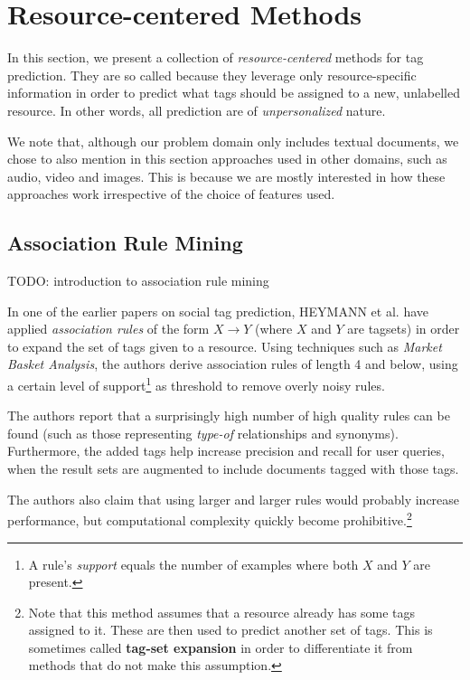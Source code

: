\section{Resource-centered Methods}\label{section:resource_centered_methods}

In this section, we present a collection of  \textit{resource-centered} methods for tag prediction. They are so called because they leverage only resource-specific information in order to predict what tags should be assigned to a new, unlabelled resource. In other words, all prediction are of \textit{unpersonalized} nature.

We note that, although our problem domain only includes textual documents, we chose to also mention in this section approaches used in other domains, such as audio, video and images. This is because we are mostly interested in how these approaches work irrespective of the choice of features used.

\subsection{Association Rule Mining}

{\color{red} TODO: introduction to association rule mining}

In one of the earlier papers on social tag prediction, HEYMANN et al. \citeyearpar{heymann_etal_2008} have applied \textit{association rules} of the form $X \rightarrow Y$ (where $X$ and $Y$ are tagsets) in order to expand the set of tags given to a resource. Using techniques such as \textit{Market Basket Analysis}, the authors derive association rules of length 4 and below, using a certain level of support\footnote{A rule's \textit{support} equals the number of examples where both $X$ and $Y$ are present.} as threshold to remove overly noisy rules.

The authors report \citep{heymann_etal_2008} that a surprisingly high number of high quality rules can be found (such as those representing \textit{type-of} relationships and synonyms). Furthermore, the added tags help increase precision and recall for user queries, when the result sets are augmented to include documents tagged with those tags.

The authors also claim that using larger and larger rules would probably increase performance, but computational complexity quickly become prohibitive.\footnote{Note that this method assumes that a resource already has some tags assigned to it. These are then used to predict another set of tags. This is sometimes called \textbf{tag-set expansion} in order to differentiate it from methods that do not make this assumption.}

